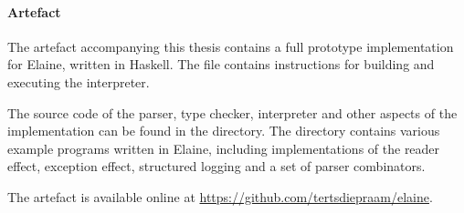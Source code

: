 \paragraph{Artefact}
The artefact accompanying this thesis contains a full prototype implementation for Elaine, written in Haskell. The  file contains instructions for building and executing the interpreter.

The source code of the parser, type checker, interpreter and other aspects of the implementation can be found in the  directory. The  directory contains various example programs written in Elaine, including implementations of the reader effect, exception effect, structured logging and a set of parser combinators. 

The artefact is available online at \url{https://github.com/tertsdiepraam/elaine}.
